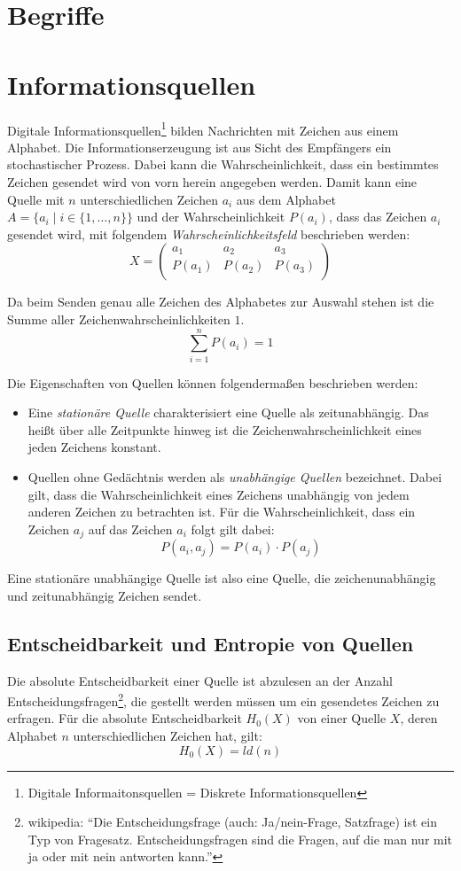 \section{Begriffe}

\section{Informationsquellen}
Digitale Informationsquellen\footnote{Digitale Informaitonsquellen = Diskrete Informationsquellen} bilden Nachrichten mit Zeichen aus einem Alphabet. Die Informationserzeugung ist aus Sicht des Empfängers ein stochastischer Prozess. Dabei kann die Wahrscheinlichkeit, dass ein bestimmtes Zeichen gesendet wird von vorn herein angegeben werden. Damit kann eine Quelle mit $n$ unterschiedlichen Zeichen $a_i$ aus dem Alphabet $A = \{a_i \mid i \in \{1, \ldots, n\}\}$ und der Wahrscheinlichkeit $P(a_i)$, dass das Zeichen $a_i$ gesendet wird, mit folgendem \textit{Wahrscheinlichkeitsfeld} beschrieben werden:
$$
	X =
	\left(
		\begin{array}{*{4}{c}}
		  a_1    &  a_2   &  a_3   \\
		  P(a_1) & P(a_2) & P(a_3) \\
		\end{array}
	\right)
$$

Da beim Senden genau alle Zeichen des Alphabetes zur Auswahl stehen ist die Summe aller Zeichenwahrscheinlichkeiten $1$.
$$
	\sum_{i=1}^n P(a_i) = 1
$$

Die Eigenschaften von Quellen können folgendermaßen beschrieben werden:
\begin{itemize}
  \item Eine \textit{stationäre Quelle} charakterisiert eine Quelle als zeitunabhängig. Das heißt über alle Zeitpunkte hinweg ist die Zeichenwahrscheinlichkeit eines jeden Zeichens konstant.
	\item Quellen ohne Gedächtnis werden als \emph{unabhängige Quellen} bezeichnet. Dabei gilt, dass die Wahrscheinlichkeit eines Zeichens unabhängig von jedem anderen Zeichen zu betrachten ist. Für die Wahrscheinlichkeit, dass ein Zeichen $a_j$ auf das Zeichen $a_i$ folgt gilt dabei:
$$ P(a_i, a_j) = P(a_i) \cdot P(a_j) $$
\end{itemize}
Eine stationäre unabhängige Quelle ist also eine Quelle, die zeichenunabhängig und zeitunabhängig Zeichen sendet.


\subsection{Entscheidbarkeit und Entropie von Quellen}
Die absolute Entscheidbarkeit einer Quelle ist abzulesen an der Anzahl Entscheidungsfragen\footnote{wikipedia: "`Die Entscheidungsfrage (auch: Ja/nein-Frage, Satzfrage) ist ein Typ von Fragesatz. Entscheidungsfragen sind die Fragen, auf die man nur mit ja oder mit nein antworten kann."'}, die gestellt werden müssen um ein gesendetes Zeichen zu erfragen. Für die absolute Entscheidbarkeit $H_0(X)$ von einer Quelle $X$, deren Alphabet $n$ unterschiedlichen Zeichen hat, gilt:
$$ H_0(X) = ld(n) $$

